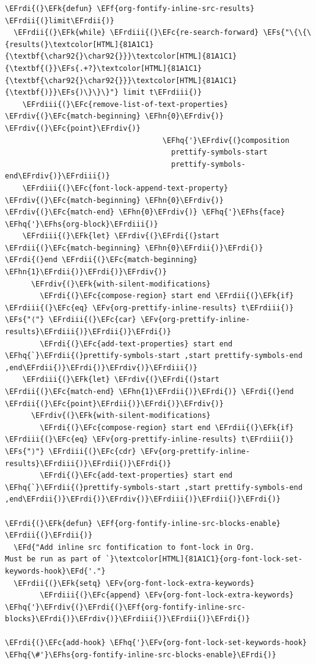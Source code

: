 \documentclass{scrartcl}
\newcommand{\EFk}[1]{\textcolor{EFk}{#1}} %
\newcommand{\EFd}[1]{\textcolor{EFd}{#1}} %
\newcommand{\EFs}[1]{\textcolor{EFs}{#1}} %
\newcommand{\EFc}[1]{\textcolor{EFc}{#1}} %
\newcommand{\EFv}[1]{\textcolor{EFv}{#1}} %
\newcommand{\EFf}[1]{\textcolor{EFf}{#1}} %
\newcommand{\EFhn}[1]{#1} %
\newcommand{\EFhq}[1]{#1} %
\newcommand{\EFhs}[1]{#1} %
\newcommand{\EFrdi}[1]{#1} %
\newcommand{\EFrdii}[1]{#1} %
\newcommand{\EFrdiii}[1]{#1} %
\newcommand{\EFrdiv}[1]{#1} %
\begin{document}
\begin{Code}
\begin{Verbatim}[]
\EFrdi{(}\EFk{defun} \EFf{org-fontify-inline-src-results} \EFrdii{(}limit\EFrdii{)}
  \EFrdii{(}\EFk{while} \EFrdiii{(}\EFc{re-search-forward} \EFs{"\{\{\{results(}\textcolor[HTML]{81A1C1}{\textbf{\char92{}\char92{}}}\textcolor[HTML]{81A1C1}{\textbf{(}}\EFs{.+?}\textcolor[HTML]{81A1C1}{\textbf{\char92{}\char92{}}}\textcolor[HTML]{81A1C1}{\textbf{)}}\EFs{)\}\}\}"} limit t\EFrdiii{)}
    \EFrdiii{(}\EFc{remove-list-of-text-properties} \EFrdiv{(}\EFc{match-beginning} \EFhn{0}\EFrdiv{)} \EFrdiv{(}\EFc{point}\EFrdiv{)}
                                    \EFhq{'}\EFrdiv{(}composition
                                      prettify-symbols-start
                                      prettify-symbols-end\EFrdiv{)}\EFrdiii{)}
    \EFrdiii{(}\EFc{font-lock-append-text-property} \EFrdiv{(}\EFc{match-beginning} \EFhn{0}\EFrdiv{)} \EFrdiv{(}\EFc{match-end} \EFhn{0}\EFrdiv{)} \EFhq{'}\EFhs{face} \EFhq{'}\EFhs{org-block}\EFrdiii{)}
    \EFrdiii{(}\EFk{let} \EFrdiv{(}\EFrdi{(}start \EFrdii{(}\EFc{match-beginning} \EFhn{0}\EFrdii{)}\EFrdi{)} \EFrdi{(}end \EFrdii{(}\EFc{match-beginning} \EFhn{1}\EFrdii{)}\EFrdi{)}\EFrdiv{)}
      \EFrdiv{(}\EFk{with-silent-modifications}
        \EFrdi{(}\EFc{compose-region} start end \EFrdii{(}\EFk{if} \EFrdiii{(}\EFc{eq} \EFv{org-prettify-inline-results} t\EFrdiii{)} \EFs{"⟨"} \EFrdiii{(}\EFc{car} \EFv{org-prettify-inline-results}\EFrdiii{)}\EFrdii{)}\EFrdi{)}
        \EFrdi{(}\EFc{add-text-properties} start end \EFhq{`}\EFrdii{(}prettify-symbols-start ,start prettify-symbols-end ,end\EFrdii{)}\EFrdi{)}\EFrdiv{)}\EFrdiii{)}
    \EFrdiii{(}\EFk{let} \EFrdiv{(}\EFrdi{(}start \EFrdii{(}\EFc{match-end} \EFhn{1}\EFrdii{)}\EFrdi{)} \EFrdi{(}end \EFrdii{(}\EFc{point}\EFrdii{)}\EFrdi{)}\EFrdiv{)}
      \EFrdiv{(}\EFk{with-silent-modifications}
        \EFrdi{(}\EFc{compose-region} start end \EFrdii{(}\EFk{if} \EFrdiii{(}\EFc{eq} \EFv{org-prettify-inline-results} t\EFrdiii{)} \EFs{"⟩"} \EFrdiii{(}\EFc{cdr} \EFv{org-prettify-inline-results}\EFrdiii{)}\EFrdii{)}\EFrdi{)}
        \EFrdi{(}\EFc{add-text-properties} start end \EFhq{`}\EFrdii{(}prettify-symbols-start ,start prettify-symbols-end ,end\EFrdii{)}\EFrdi{)}\EFrdiv{)}\EFrdiii{)}\EFrdii{)}\EFrdi{)}

\EFrdi{(}\EFk{defun} \EFf{org-fontify-inline-src-blocks-enable} \EFrdii{(}\EFrdii{)}
  \EFd{"Add inline src fontification to font-lock in Org.
Must be run as part of `}\textcolor[HTML]{81A1C1}{org-font-lock-set-keywords-hook}\EFd{'."}
  \EFrdii{(}\EFk{setq} \EFv{org-font-lock-extra-keywords}
        \EFrdiii{(}\EFc{append} \EFv{org-font-lock-extra-keywords} \EFhq{'}\EFrdiv{(}\EFrdi{(}\EFf{org-fontify-inline-src-blocks}\EFrdi{)}\EFrdiv{)}\EFrdiii{)}\EFrdii{)}\EFrdi{)}

\EFrdi{(}\EFc{add-hook} \EFhq{'}\EFv{org-font-lock-set-keywords-hook} \EFhq{\#'}\EFhs{org-fontify-inline-src-blocks-enable}\EFrdi{)}
\end{Verbatim}
\end{Code}
\end{document}

